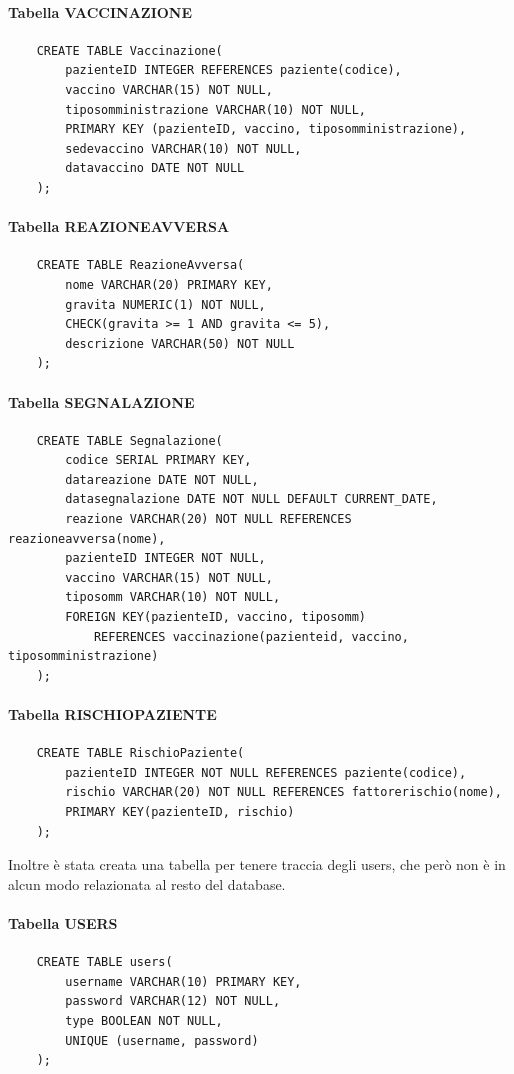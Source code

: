 \documentclass{article}
\begin{document}
\paragraph*{Tabella VACCINAZIONE}
\begin{verbatim}
    CREATE TABLE Vaccinazione(
        pazienteID INTEGER REFERENCES paziente(codice),
        vaccino VARCHAR(15) NOT NULL,
        tiposomministrazione VARCHAR(10) NOT NULL,
        PRIMARY KEY (pazienteID, vaccino, tiposomministrazione),
        sedevaccino VARCHAR(10) NOT NULL,
        datavaccino DATE NOT NULL
    );
\end{verbatim}
\paragraph*{Tabella REAZIONEAVVERSA}
\begin{verbatim}
    CREATE TABLE ReazioneAvversa(
        nome VARCHAR(20) PRIMARY KEY,
        gravita NUMERIC(1) NOT NULL,
        CHECK(gravita >= 1 AND gravita <= 5),
        descrizione VARCHAR(50) NOT NULL
    );
\end{verbatim}
\paragraph*{Tabella SEGNALAZIONE}
\begin{verbatim}
    CREATE TABLE Segnalazione(
        codice SERIAL PRIMARY KEY,
        datareazione DATE NOT NULL,
        datasegnalazione DATE NOT NULL DEFAULT CURRENT_DATE,
        reazione VARCHAR(20) NOT NULL REFERENCES reazioneavversa(nome),
        pazienteID INTEGER NOT NULL,
        vaccino VARCHAR(15) NOT NULL,
        tiposomm VARCHAR(10) NOT NULL,
        FOREIGN KEY(pazienteID, vaccino, tiposomm) 
            REFERENCES vaccinazione(pazienteid, vaccino, tiposomministrazione)
    );
\end{verbatim}
\paragraph*{Tabella RISCHIOPAZIENTE}
\begin{verbatim}
    CREATE TABLE RischioPaziente(
        pazienteID INTEGER NOT NULL REFERENCES paziente(codice),
        rischio VARCHAR(20) NOT NULL REFERENCES fattorerischio(nome),
        PRIMARY KEY(pazienteID, rischio)
    );
\end{verbatim}
Inoltre è stata creata una tabella per tenere traccia degli users, che però non è in alcun modo relazionata al resto del database.
\paragraph*{Tabella USERS}
\begin{verbatim}
    CREATE TABLE users(
        username VARCHAR(10) PRIMARY KEY,
        password VARCHAR(12) NOT NULL,
        type BOOLEAN NOT NULL,
        UNIQUE (username, password)
    );
\end{verbatim}
\end{document}
